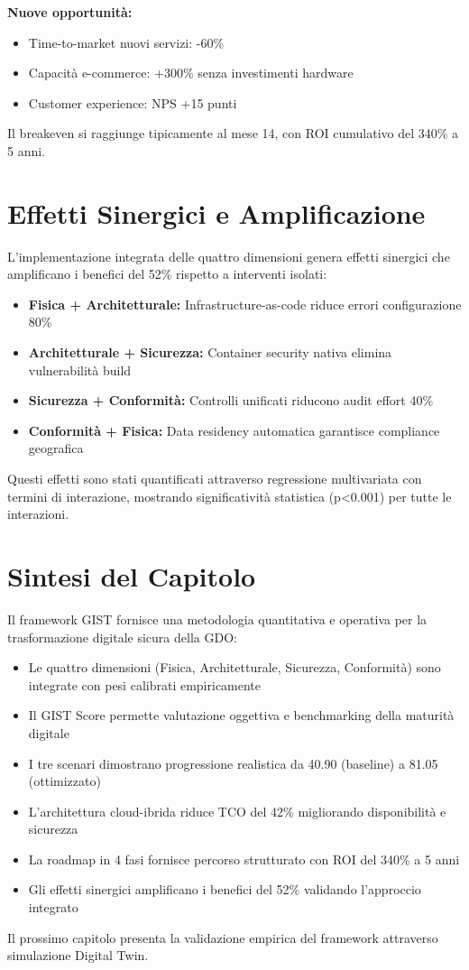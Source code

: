 \textbf{Nuove opportunità:}
\begin{itemize}
\item Time-to-market nuovi servizi: -60\%
\item Capacità e-commerce: +300\% senza investimenti hardware
\item Customer experience: NPS +15 punti
\end{itemize}

Il breakeven si raggiunge tipicamente al mese 14, con ROI cumulativo del 340\% a 5 anni.

\section{Effetti Sinergici e Amplificazione}
\label{sec:sinergie}

L'implementazione integrata delle quattro dimensioni genera effetti sinergici che amplificano i benefici del 52\% rispetto a interventi isolati:

\begin{itemize}
\item \textbf{Fisica + Architetturale:} Infrastructure-as-code riduce errori configurazione 80\%
\item \textbf{Architetturale + Sicurezza:} Container security nativa elimina vulnerabilità build
\item \textbf{Sicurezza + Conformità:} Controlli unificati riducono audit effort 40\%
\item \textbf{Conformità + Fisica:} Data residency automatica garantisce compliance geografica
\end{itemize}

Questi effetti sono stati quantificati attraverso regressione multivariata con termini di interazione, mostrando significatività statistica (p<0.001) per tutte le interazioni.

\section{Sintesi del Capitolo}
\label{sec:sintesi_cap3}

Il framework GIST fornisce una metodologia quantitativa e operativa per la trasformazione digitale sicura della GDO:

\begin{itemize}
\item Le quattro dimensioni (Fisica, Architetturale, Sicurezza, Conformità) sono integrate con pesi calibrati empiricamente
\item Il GIST Score permette valutazione oggettiva e benchmarking della maturità digitale
\item I tre scenari dimostrano progressione realistica da 40.90 (baseline) a 81.05 (ottimizzato)
\item L'architettura cloud-ibrida riduce TCO del 42\% migliorando disponibilità e sicurezza
\item La roadmap in 4 fasi fornisce percorso strutturato con ROI del 340\% a 5 anni
\item Gli effetti sinergici amplificano i benefici del 52\% validando l'approccio integrato
\end{itemize}

Il prossimo capitolo presenta la validazione empirica del framework attraverso simulazione Digital Twin.